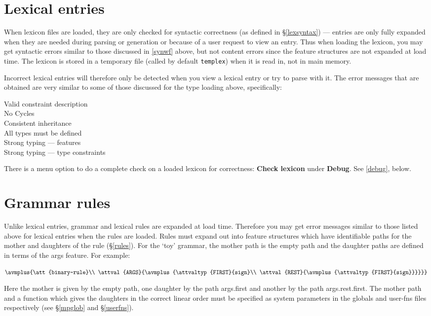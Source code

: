 \documentclass[12pt]{report}
\begin{document}
\section{Lexical entries}

When lexicon files are loaded, they are only checked for syntactic correctness 
(as defined in \S\ref{lexsyntax})
--- entries are only fully expanded when they are needed
during parsing or generation
or because of a user request to view an entry.  Thus when loading
the lexicon, you may get syntactic errors similar to those discussed
in \ref{synwf} above, but not content errors since
the feature structures are not expanded
at load time. 
The lexicon is
stored in a temporary file (called by default {\tt templex}) when it
is read in, not in main memory.  

Incorrect lexical entries will therefore only be detected when you view a 
lexical entry or try to parse with it.  The error messages
that are obtained are very similar to some of those discussed for the
type loading above, specifically: 
\begin{description}
\item[Valid constraint description] 
\item[No Cycles]
\item[Consistent inheritance]
\item[All types must be defined]
\item[Strong typing --- features]
\item[Strong typing --- type constraints]
\end{description}

There is a menu option to 
do a complete check on a loaded lexicon for correctness:
{\bf Check lexicon} under {\bf Debug}.  See \ref{debug}, below.

\section{Grammar rules}

Unlike lexical entries, grammar and lexical rules are expanded at load time.
Therefore you may get error messages similar to those listed
above for lexical entries when the rules are loaded.
Rules must expand out into feature structures which have identifiable paths
for the mother and daughters of the rule (\S\ref{rules}).  For the `toy'
grammar, the mother path is the empty path and the daughter
paths are defined in terms of the {\sc args} feature.  For example:
\begin{center}
{\tiny
   $\avmplus{\att{binary-rule}\\
             \attval{ARGS}{\avmplus{\attvaltyp{FIRST}{sign}\\
                                    \attval{REST}{\avmplus{\attvaltyp{FIRST}{sign}}}}}}$}
\end{center}
Here the mother is given by the empty path, one daughter 
by the path {\sc args}.{\sc first} and another by the path
{\sc args}.{\sc rest}.{\sc first}.  
The mother path and a function which gives the
daughters in the correct linear order must be specified as system parameters
in the globals and user-fns files respectively (see \S\ref{mpglob} and
\S\ref{userfns}).
\end{document}
